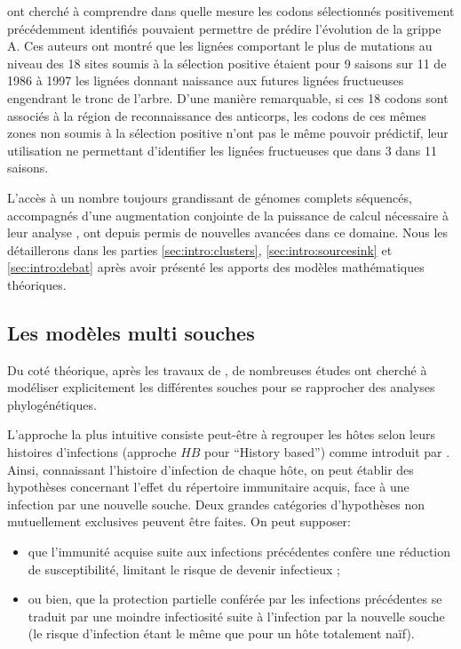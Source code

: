 \citet{Bush1999} ont cherché à comprendre dans quelle mesure les
codons sélectionnés positivement précédemment identifiés pouvaient
permettre de prédire l'évolution de la grippe A. Ces auteurs ont
montré que les lignées comportant le plus de mutations au niveau des
18 sites soumis à la sélection positive étaient pour 9 saisons sur 11
de 1986 à 1997 les lignées donnant naissance aux futures lignées
fructueuses engendrant le tronc de l'arbre. D'une manière remarquable,
si ces 18 codons sont associés à la région de reconnaissance des
anticorps, les codons de ces mêmes zones non soumis à la sélection
positive n'ont pas le même pouvoir prédictif, leur utilisation ne
permettant d'identifier les lignées fructueuses que dans 3 dans 11
saisons.

L'accès à un nombre toujours grandissant de génomes complets
séquencés, accompagnés d'une augmentation conjointe de la puissance de
calcul nécessaire à leur analyse \citep{Holmes2007}, ont depuis permis
de nouvelles avancées dans ce domaine. Nous les détaillerons dans les
parties \ref{sec:intro:clusters}, \ref{sec:intro:sourcesink} et
\ref{sec:intro:debat} après avoir présenté les apports des modèles
mathématiques théoriques.


\subsection{Les modèles multi souches}

Du coté théorique, après les travaux de \citet{Pease1987}, de
nombreuses études ont cherché à modéliser explicitement les
différentes souches pour se rapprocher des analyses phylogénétiques.

L'approche la plus intuitive consiste peut-être à regrouper les hôtes
selon leurs histoires d'infections (approche $HB$ pour ``History
based'') comme introduit par \citet{Andreasen1997}. Ainsi, connaissant
l'histoire d'infection de chaque hôte, on peut établir des hypothèses
concernant l'effet du répertoire immunitaire acquis, face à une
infection par une nouvelle souche. Deux grandes catégories
d'hypothèses non mutuellement exclusives peuvent être faites. On peut
supposer:
\begin{itemize}
\item que l'immunité acquise suite aux infections précédentes confère
  une réduction de susceptibilité, limitant le risque de devenir
  infectieux ;
\item ou bien, que la protection partielle conférée par les infections
  précédentes se traduit par une moindre infectiosité suite à
  l'infection par la nouvelle souche (le risque d'infection étant le
  même que pour un hôte totalement naïf).
\end{itemize}

